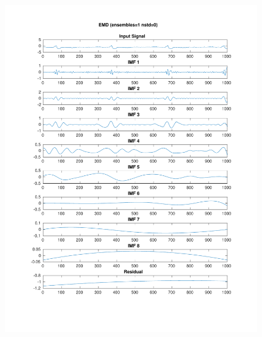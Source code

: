 \documentclass[11pt,a4paper]{article}
\begin{document}
\begin{figure}[H]
\centering
\begin{minipage}{0.48\textwidth}
	\centering
	\includegraphics[width=\textwidth]{fig/118l1_emd.pdf}
\end{minipage}
\begin{minipage}{0.48\textwidth}
	\centering

\end{minipage}
\end{figure}
\end{document}
